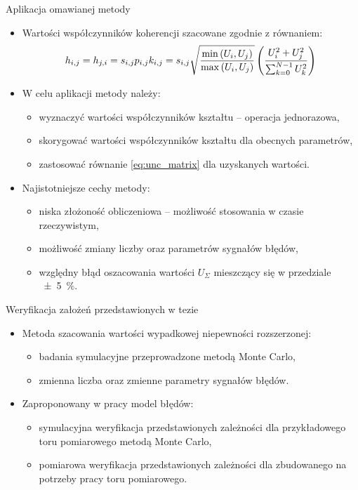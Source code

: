 \documentclass[12pt, polish, aspectratio = 169]{slides}
\begin{document}
\begin{frame}{Aplikacja omawianej metody}
\begin{itemize}
\item Wartości współczynników koherencji szacowane zgodnie z równaniem:
\begin{equation}
h_{i,j} = h_{j,i} = s_{i,j} p_{i,j} k_{i,j} = s_{i,j} \sqrt{\frac{\min \left(U_{i}, U_{j}\right)}{\max \left(U_{i}, U_{j}\right)}} \left( \frac{U_{i}^{2} + U_{j}^{2}}{\sum _{k = 0} ^{N-1} U_{k}^{2}} \right) \label{eq:unc_coher}
\end{equation}
\item W celu aplikacji metody należy:
	\begin{itemize}
	\item wyznaczyć wartości współczynników kształtu -- operacja jednorazowa,
	\item skorygować wartości współczynników kształtu dla obecnych parametrów,
	\item zastosować równanie \eqref{eq:unc_matrix} dla uzyskanych wartości.
	\end{itemize}
\item Najistotniejsze cechy metody:
	\begin{itemize}
	\item niska złożoność obliczeniowa -- możliwość stosowania w czasie rzeczywistym,
	\item możliwość zmiany liczby oraz parametrów sygnałów błędów,
	\item względny błąd oszacowania wartości $U_{\Sigma}$ mieszczący się w przedziale \qty{\pm 5}{\percent}.
	\end{itemize}
\end{itemize}
\end{frame}


\begin{frame}{Weryfikacja założeń przedstawionych w tezie}
\begin{itemize}
\item Metoda szacowania wartości wypadkowej niepewności rozszerzonej:
	\begin{itemize}
	\item badania symulacyjne przeprowadzone metodą Monte Carlo,
	\item zmienna liczba oraz zmienne parametry sygnałów błędów.
	\end{itemize}
\item Zaproponowany w pracy model błędów:
	\begin{itemize}
	\item symulacyjna weryfikacja przedstawionych zależności dla przykładowego toru pomiarowego metodą Monte Carlo,
	\item pomiarowa weryfikacja przedstawionych zależności dla zbudowanego na potrzeby pracy toru pomiarowego.
	\end{itemize}
\end{itemize}
\end{frame}
\end{document}
